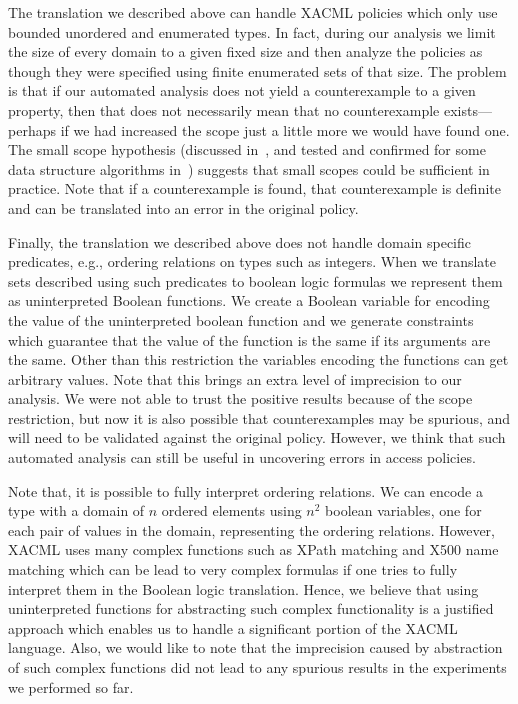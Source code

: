 The translation we described above can handle XACML policies which
only use bounded unordered and enumerated types.  In fact, during our
analysis we limit the size of every domain to a given fixed size and
then analyze the policies as though they were specified using finite
enumerated sets of that size.  The problem is that if our automated
analysis does not yield a counterexample to a given property, then
that does not necessarily mean that no counterexample exists---perhaps
if we had increased the scope just a little more we would have found
one.  The small scope hypothesis (discussed
in~\cite{jackson:elements}, and tested and confirmed for some data
structure algorithms in~\cite{marinov:exhaustive}) suggests that small
scopes could be sufficient in practice.  Note that if a counterexample
is found, that counterexample is definite and can be translated into
an error in the original policy.

Finally, the translation we described above does not handle domain
specific predicates, e.g., ordering relations on types such as
integers.  When we translate sets described using such predicates to
boolean logic formulas we represent them as uninterpreted Boolean
functions.  We create a Boolean variable for encoding the value of the
uninterpreted boolean function and we generate constraints which
guarantee that the value of the function is the same if its arguments
are the same.  Other than this restriction the variables encoding the
functions can get arbitrary values.  Note that this brings an extra
level of imprecision to our analysis.  We were not able to trust the
positive results because of the scope restriction, but now it is also
possible that counterexamples may be spurious, and will need to be
validated against the original policy.  However, we think that such
automated analysis can still be useful in uncovering errors in access
policies.

Note that, it is possible to fully interpret ordering relations.  We
can encode a type with a domain of $n$ ordered elements using $n^2$
boolean variables, one for each pair of values in the domain,
representing the ordering relations.  However, XACML uses many complex
functions such as XPath matching and X500 name matching which can be
lead to very complex formulas if one tries to fully interpret them in
the Boolean logic translation.  Hence, we believe that using
uninterpreted functions for abstracting such complex functionality is
a justified approach which enables us to handle a significant portion
of the XACML language.  Also, we would like to note that the
imprecision caused by abstraction of such complex functions did not
lead to any spurious results in the experiments we performed so far.

